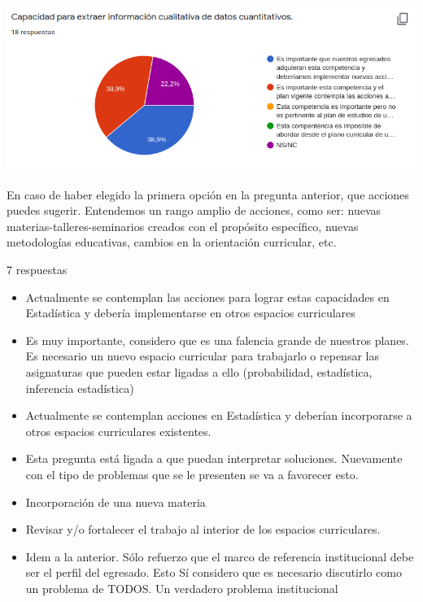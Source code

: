 \documentclass[a4paper,10pt,BCOR10mm,oneside,headsepline]{scrbook}
\begin{document}
\begin{subappendices}
\begin{center}
\includegraphics[scale=.9]{doc16.png}
 \end{center}
 

 En caso de haber elegido la primera opción en la pregunta anterior, que acciones puedes sugerir. Entendemos un rango amplio de acciones, como ser: nuevas materias-talleres-seminarios creados con el propósito específico, nuevas metodologías educativas, cambios en la orientación curricular, etc.
 
 7 respuestas
 
 \begin{itemize}
  \item Actualmente se contemplan las acciones para lograr estas capacidades en Estadística y debería implementarse en otros espacios curriculares

  \item Es muy importante, considero que es una falencia grande de nuestros planes. Es necesario un nuevo espacio curricular para trabajarlo o repensar las asignaturas que pueden estar ligadas a ello (probabilidad, estadística, inferencia estadística)
  
\item Actualmente se contemplan acciones en Estadística y deberían incorporarse a otros espacios curriculares existentes.
\item Esta pregunta está ligada a que puedan interpretar soluciones. Nuevamente con el tipo de problemas que se le presenten se va a favorecer esto. 

\item Incorporación de una  nueva materia
\item Revisar y/o fortalecer el trabajo al interior de los espacios curriculares.
\item Idem a la anterior. Sólo refuerzo que el marco de referencia institucional debe ser el perfil del egresado. Esto Sí considero que es necesario discutirlo como un problema de TODOS. Un verdadero problema institucional
 
 \end{itemize}
 

\end{subappendices}
\end{document}
